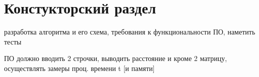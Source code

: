 \chapter{ Констукторский раздел}
\label{cha:design}
    разработка алгоритма и его схема, 
    требования к функциональности ПО,
    наметить тесты 

    ПО должно вводить 2 строчки, выводить расстояние и кроме
    2 матрицу, осуществлять замеры проц. времени t [и памяти]
\newpage